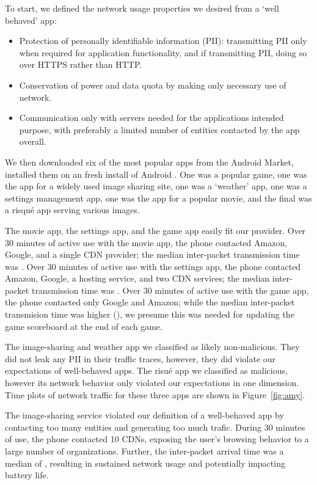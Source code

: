     To start, we defined the network usage properties we desired from a `well behaved' app:
    \begin{itemize}
        \item Protection of personally identifiable information (PII): transmitting PII only when required for application functionality, and if transmitting PII, doing so over HTTPS rather than HTTP.
        \item Conservation of power and data quota by making only necessary use of network.
        \item Communication only with servers needed for the applications intended purpose, with preferably a limited number of entities contacted by the app overall.
    \end{itemize}
    We then downloaded six of the most popular apps from the Android Market, installed them on an fresh install of Android . 
    One was a popular game, one was the app for a widely used image sharing site, one was a `weather' app, one was a settings management app, one was the app for a popular movie, and the final was a risqu\'{e} app serving various images. 

    The movie app, the settings app, and the game app easily fit our provider.
    Over 30 minutes of active use with the movie app, the phone contacted Amazon, Google, and a single CDN provider; the median inter-packet transmission time was .
    Over 30 minutes of active use with the settings app, the phone contacted Amazon, Google, a hosting service, and two CDN services; the median inter-packet transmission time was .
    Over 30 minutes of active use with the game app, the phone contacted only Google and Amazon; while the median inter-packet transmision time was higher (), we presume this was needed for updating the game scoreboard at the end of each game.

    The image-sharing and weather app we classified as likely non-malicious. They did not leak any PII in their traffic traces, however, they did violate our expectations of well-behaved apps. The risu\'{e} app we classified as malicious, however its network behavior only violated our expectations in one dimension. 
    Time plots of network traffic for these three apps are shown in Figure~\ref{fig:amy}.

    The image-sharing service violated our definition of a well-behaved app by contacting too many entities and generating too much trafic. 
    During 30 minutes of use, the phone contacted 10 CDNs, exposing the user's browsing behavior to a large number of organizations.
    Further, the inter-packet arrival time was a median of , resulting in sustained network usage and potentially impacting battery life.

